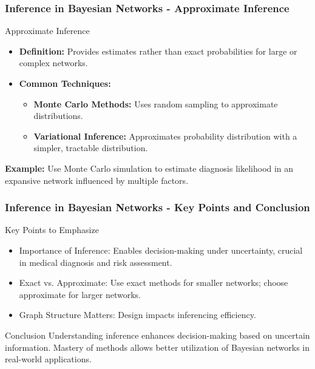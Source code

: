 \documentclass[aspectratio=169]{beamer}
\begin{document}
\begin{frame}[fragile]
    \frametitle{Inference in Bayesian Networks - Approximate Inference}
    \begin{block}{Approximate Inference}
        \begin{itemize}
            \item \textbf{Definition:} Provides estimates rather than exact probabilities for large or complex networks.
            \item \textbf{Common Techniques:}
                \begin{itemize}
                    \item \textbf{Monte Carlo Methods:} Uses random sampling to approximate distributions.
                    \item \textbf{Variational Inference:} Approximates probability distribution with a simpler, tractable distribution.
                \end{itemize}
        \end{itemize}
        \textbf{Example:} Use Monte Carlo simulation to estimate diagnosis likelihood in an expansive network influenced by multiple factors.
    \end{block}
\end{frame}

\begin{frame}[fragile]
    \frametitle{Inference in Bayesian Networks - Key Points and Conclusion}
    \begin{block}{Key Points to Emphasize}
        \begin{itemize}
            \item Importance of Inference: Enables decision-making under uncertainty, crucial in medical diagnosis and risk assessment.
            \item Exact vs. Approximate: Use exact methods for smaller networks; choose approximate for larger networks.
            \item Graph Structure Matters: Design impacts inferencing efficiency.
        \end{itemize}
    \end{block}

    \begin{block}{Conclusion}
        Understanding inference enhances decision-making based on uncertain information. Mastery of methods allows better utilization of Bayesian networks in real-world applications.
    \end{block}
\end{frame}
\end{document}
